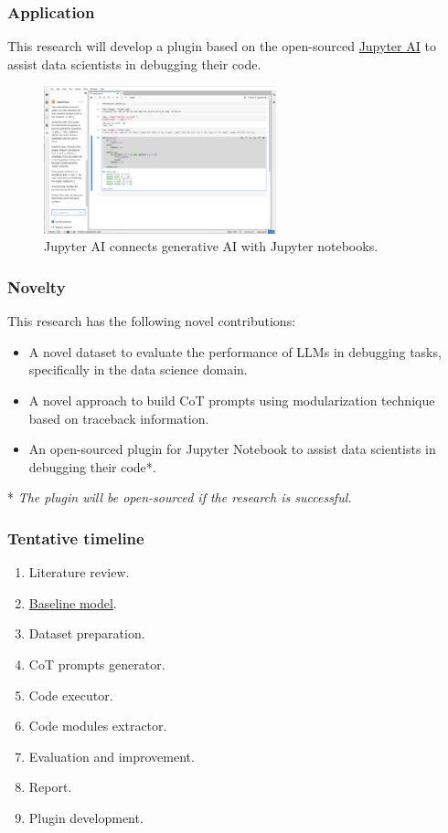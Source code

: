 \documentclass{beamer}
\newcounter{cont}
\begin{document}
\begin{frame}[allowframebreaks]
\frametitle{Application}
This research will develop a plugin based on the open-sourced \href{https://github.com/jupyterlab/jupyter-ai?tab=readme-ov-file}{Jupyter AI} to assist data scientists in debugging their code.
  \begin{figure}
    \centering
    \includegraphics[width=0.6\textwidth]{img/jupyter_ai_screenshot.png}
    \caption{Jupyter AI connects generative AI with Jupyter notebooks.}
  \end{figure}
\end{frame}

\begin{frame}[allowframebreaks]
\frametitle{Novelty}
This research has the following novel contributions:
  \begin{itemize}
    \item A novel dataset to evaluate the performance of LLMs in debugging tasks, specifically in the data science domain.
    \item A novel approach to build CoT prompts using modularization technique based on traceback information.
    \item An open-sourced plugin for Jupyter Notebook to assist data scientists in debugging their code*.
  \end{itemize}
  * \textit{The plugin will be open-sourced if the research is successful.}
\end{frame}

\begin{frame}[allowframebreaks]
\frametitle{Tentative timeline}
  \begin{enumerate}
    \item Literature review.
    \item \underline{Baseline model}.
    \item Dataset preparation.
    \item CoT prompts generator.
    \item Code executor.
    \item Code modules extractor.
    \item Evaluation and improvement.
    \item Report.
    \item Plugin development.
  \end{enumerate}
\end{frame}
\end{document}
